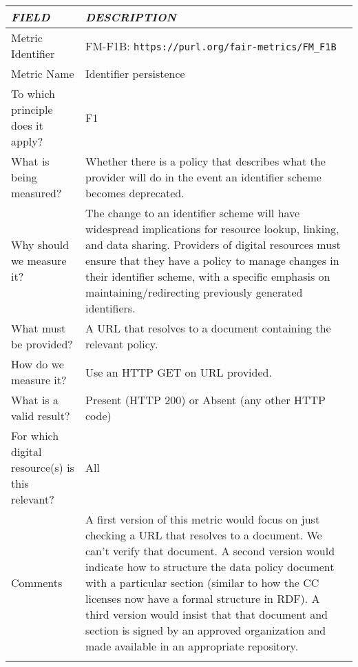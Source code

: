 \documentclass[english]{article}
\begin{document}
\begin{longtable}{|p{5cm}|p{9cm}|}
\hline
\emph{FIELD} & \emph{DESCRIPTION} \\
\hline
Metric Identifier &   FM-F1B: \verb"https://purl.org/fair-metrics/FM_F1B"
 \\


\hline
Metric Name &   
Identifier persistence
 \\



\hline
To which principle does it apply? &   F1\\



\hline
What is being measured? & Whether there is a policy that describes what the provider will do in the event an identifier scheme becomes deprecated.\\



\hline
Why should we measure it? & 

The change to an identifier scheme will have widespread implications for resource lookup, linking, and data sharing. Providers of digital resources must ensure that they have a policy to manage changes in their identifier scheme, with a specific emphasis on maintaining/redirecting previously generated identifiers.
  
\\



\hline
What must be provided? &  
A URL that resolves to a document containing the relevant policy.
 \\



\hline
How do we measure it? &  
Use an HTTP GET on URL provided. \newline
\\



\hline
What is a valid result? &  
Present (HTTP 200) or Absent (any other HTTP code)
\\



\hline
For which digital resource(s) is this relevant? &  All\\





\hline

Comments & 

A first version of this metric would focus on just checking a URL that resolves to a document. We can’t verify that document. \newline
A second version would indicate how to structure the data policy document with a particular section (similar to how the CC licenses now have a formal structure in RDF).\newline
A third version would insist that that document and section is signed by an approved organization and made available in an appropriate repository. \\ 

\hline
\\

\end{longtable}
\end{document}
